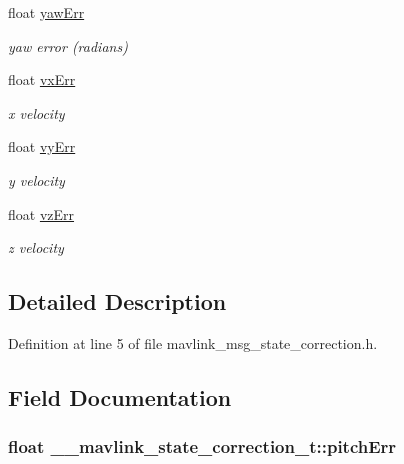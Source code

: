 \begin{DoxyCompactItemize}
float \hyperlink{struct____mavlink__state__correction__t_a22e48f6296de1a6751c7be4df6442aa9}{yaw\-Err}
\begin{DoxyCompactList}\small\item\em yaw error (radians) \end{DoxyCompactList}\item 
float \hyperlink{struct____mavlink__state__correction__t_a52c6fe18ffee4aee62bbccc79a6bd2cb}{vx\-Err}
\begin{DoxyCompactList}\small\item\em x velocity \end{DoxyCompactList}\item 
float \hyperlink{struct____mavlink__state__correction__t_a2db19032f05d6f0b066d7e9a78fa34a7}{vy\-Err}
\begin{DoxyCompactList}\small\item\em y velocity \end{DoxyCompactList}\item 
float \hyperlink{struct____mavlink__state__correction__t_aad12e879c31e56d07fc0a4f95750e701}{vz\-Err}
\begin{DoxyCompactList}\small\item\em z velocity \end{DoxyCompactList}\end{DoxyCompactItemize}


\subsection{Detailed Description}


Definition at line 5 of file mavlink\-\_\-msg\-\_\-state\-\_\-correction.\-h.



\subsection{Field Documentation}
\hypertarget{struct____mavlink__state__correction__t_a6a077d47f05b62f2440337cf7369563e}{
\subsubsection[{pitch\-Err}]{\setlength{\rightskip}{0pt plus 5cm}float \-\_\-\-\_\-mavlink\-\_\-state\-\_\-correction\-\_\-t\-::pitch\-Err}}\label{struct____mavlink__state__correction__t_a6a077d47f05b62f2440337cf7369563e}


